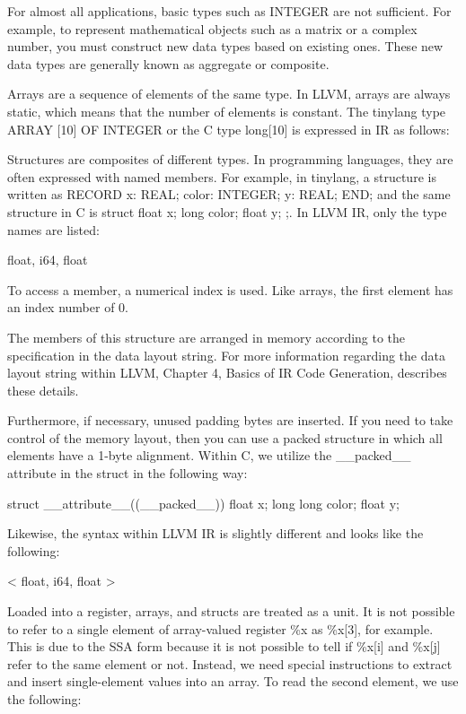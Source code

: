 For almost all applications, basic types such as INTEGER are not sufficient. For example, to represent mathematical objects such as a matrix or a complex number, you must construct new data types based on existing ones. These new data types are generally known as aggregate or composite.

Arrays are a sequence of elements of the same type. In LLVM, arrays are always static, which means that the number of elements is constant. The tinylang type ARRAY [10] OF INTEGER or the C type long[10] is expressed in IR as follows:

\begin{shell}
[10 x i64]
\end{shell}

Structures are composites of different types. In programming languages, they are often expressed with named members. For example, in tinylang, a structure is written as RECORD x: REAL; color: INTEGER; y: REAL; END; and the same structure in C is struct { float x; long color; float y; };. In LLVM IR, only the type names are listed:

\begin{shell}
{ float, i64, float }
\end{shell}

To access a member, a numerical index is used. Like arrays, the first element has an index number of 0.

The members of this structure are arranged in memory according to the specification in the data layout string. For more information regarding the data layout string within LLVM, Chapter 4, Basics of IR Code Generation, describes these details.

Furthermore, if necessary, unused padding bytes are inserted. If you need to take control of the memory layout, then you can use a packed structure in which all elements have a 1-byte alignment. Within C, we utilize the \_\_packed\_\_ attribute in the struct in the following way:

\begin{cpp}
struct __attribute__((__packed__)) { float x; long long color; float y; }
\end{cpp}

Likewise, the syntax within LLVM IR is slightly different and looks like the following:

\begin{shell}
<{ float, i64, float }>
\end{shell}

Loaded into a register, arrays, and structs are treated as a unit. It is not possible to refer to a single element of array-valued register \%x as \%x[3], for example. This is due to the SSA form because it is not possible to tell if \%x[i] and \%x[j] refer to the same element or not. Instead, we need special instructions to extract and insert single-element values into an array. To read the second element, we use the following:

